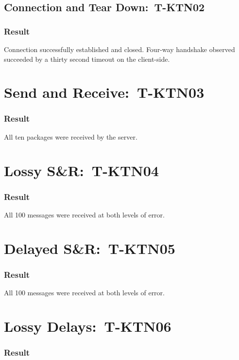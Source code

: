 \documentclass{article}
\begin{document}
\subsection{Connection and Tear Down:\ T-KTN02}

\subsubsection{Result}

Connection successfully established and closed. Four-way handshake observed
succeeded by a thirty second timeout on the client-side.

\section{Send and Receive:\ T-KTN03}

\subsubsection{Result}

All ten packages were received by the server.

\section{Lossy S\&R:\ T-KTN04}

\subsubsection{Result}

All 100 messages were received at both levels of error.

\section{Delayed S\&R:\ T-KTN05}

\subsubsection{Result}

All 100 messages were received at both levels of error.

\section{Lossy Delays:\ T-KTN06}

\subsubsection{Result}
\end{document}
